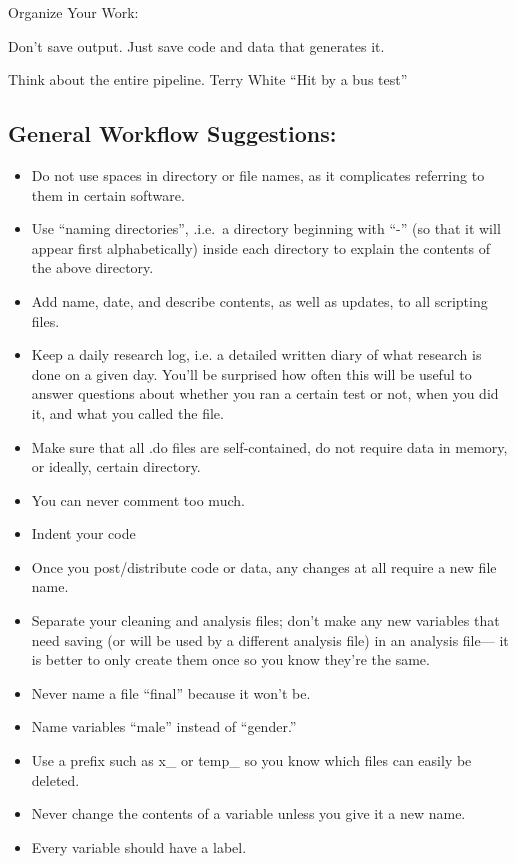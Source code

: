 \documentclass[12pt] {article}
\begin{document}
Organize Your Work:

Don't save output. Just save code and data that generates it.

Think about the entire pipeline. Terry White ``Hit by a bus test''

\subsection{General Workflow
Suggestions:}\label{general-workflow-suggestions}

\begin{itemize}
\item
  Do not use spaces in directory or file names, as it complicates referring to them in certain software.
\item
  Use ``naming directories'', .i.e.~a directory beginning with ``-'' (so
  that it will appear first alphabetically) inside each directory to
  explain the contents of the above directory.
\item
  Add name, date, and describe contents, as well as updates, to all
  scripting files.
\item
  Keep a daily research log, i.e. a detailed written diary of what research is done on a given day. You'll be surprised how often this will be useful to answer questions about whether you ran a certain test or not, when you did it, and what you called the file.
  
\item
    Make sure that all .do files are self-contained, do not require data
    in memory, or ideally, certain directory.
 
\item
  You can never comment too much.
\item
  Indent your code
\item
    Once you post/distribute code or data, any changes at all require a
    new file name.
\item
  Separate your cleaning and analysis files; don't make any new variables
  that need saving (or will be used by a different analysis
  file) in an analysis file--- it is better to only create them once so you know they're the same.
\item
  Never name a file ``final'' because it won't be.
\item
  Name variables ``male'' instead of ``gender.''
\item
  Use a prefix such as x\_ or temp\_ so you know which files can easily
  be deleted.
\item
  Never change the contents of a variable unless you give it a new name.
\item
  Every variable should have a label.
\end{itemize}
\end{document}
